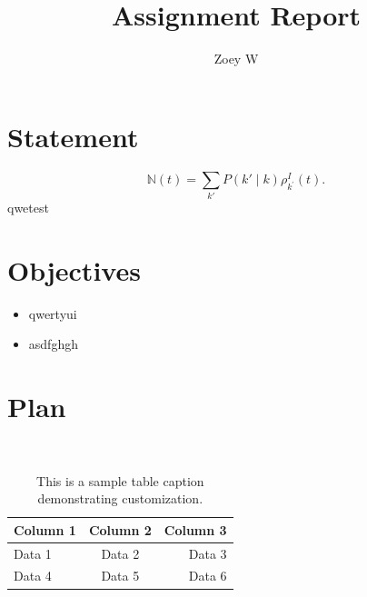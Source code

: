 \documentclass[12pt]{article}
\begin{document}
 
 
\title{Assignment Report}
\author{Zoey W}
\maketitle

\section*{Statement}
\lipsum[1-1]
\begin{equation} %
    \mathbb{N}(t)=\sum_{k'}P(k'\mid k)\rho^{I}_{k^{'}}(t).
\end{equation}
\lipsum[2-2]
qwetest\cite{wei2022chain}

\section*{Objectives}
\lipsum[3-3]
\begin{itemize} %
    \item qwertyui
    \item asdfghgh
\end{itemize}

\section*{Plan}
\lipsum[4-4]\\ 
\begin{table}[h] %
    \sffamily  %
    \vspace{2pt} 
    \centering
    \begin{tabular}{lcr} 
        \toprule
        Column 1 & Column 2 & Column 3 \\
        \midrule
        Data 1   & Data 2   & Data 3   \\
        Data 4   & Data 5   & Data 6   \\
        \bottomrule
    \end{tabular} \label{tab1}
    \caption{This is a sample table caption demonstrating customization.}
\end{table}
\end{document}
